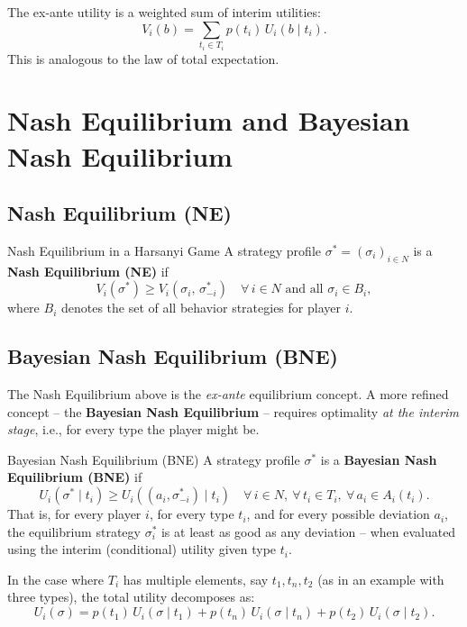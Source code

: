 \documentclass[12pt, a4paper]{article}
\begin{document}
\begin{takebox}
  The ex-ante utility is a weighted sum of interim utilities:
  \[
    V_i(b) = \sum_{t_i \in T_i} p(t_i)\, U_i(b \mid t_i).
  \]
  This is analogous to the law of total expectation.
\end{takebox}

\section{Nash Equilibrium and Bayesian Nash Equilibrium}

\subsection{Nash Equilibrium (NE)}

\begin{defbox}{Nash Equilibrium in a Harsanyi Game}
A strategy profile $\sigma^* = (\sigma_i)_{i \in N}$ is a \textbf{Nash Equilibrium (NE)} if
\[
  V_i(\sigma^*) \geq V_i(\sigma_i,\, \sigma_{-i}^*) \quad \forall\, i \in N \text{ and all } \sigma_i \in B_i,
\]
where $B_i$ denotes the set of all behavior strategies for player $i$.
\end{defbox}

\subsection{Bayesian Nash Equilibrium (BNE)}

The Nash Equilibrium above is the \emph{ex-ante} equilibrium concept. A more refined concept -- the \textbf{Bayesian Nash Equilibrium} -- requires optimality \emph{at the interim stage}, i.e., for every type the player might be.

\begin{defbox}{Bayesian Nash Equilibrium (BNE)}
A strategy profile $\sigma^*$ is a \textbf{Bayesian Nash Equilibrium (BNE)} if
\[
  U_i(\sigma^* \mid t_i) \geq U_i\!\left((a_i, \sigma_{-i}^*) \mid t_i\right)
  \quad \forall\, i \in N,\ \forall\, t_i \in T_i,\ \forall\, a_i \in A_i(t_i).
\]
That is, for every player $i$, for every type $t_i$, and for every possible deviation $a_i$, the equilibrium strategy $\sigma_i^*$ is at least as good as any deviation -- when evaluated using the interim (conditional) utility given type $t_i$.
\end{defbox}

\begin{notebox}
In the case where $T_i$ has multiple elements, say $t_1, t_{n}, t_2$ (as in an example with three types), the total utility decomposes as:
\[
  U_i(\sigma) = p(t_1)\, U_i(\sigma \mid t_1) + p(t_n)\, U_i(\sigma \mid t_n) + p(t_2)\, U_i(\sigma \mid t_2).
\]
\end{notebox}
\end{document}

